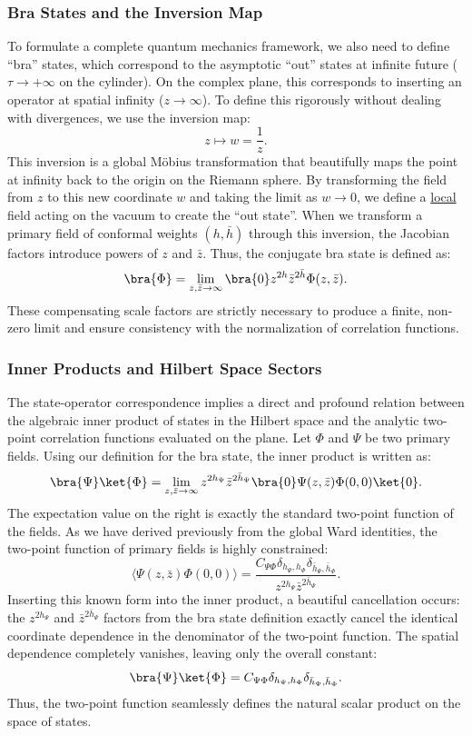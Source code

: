 \subsubsection{Bra States and the Inversion Map}

To formulate a complete quantum mechanics framework, we also need to define ``bra'' states, which correspond to the asymptotic ``out'' states at infinite future (\(\tau \to +\infty\) on the cylinder). On the complex plane, this corresponds to inserting an operator at spatial infinity (\(z \to \infty\)). To define this rigorously without dealing with divergences, we use the inversion map:
\[
    z \mapsto w = \frac{1}{z}.
\]
This inversion is a global Möbius transformation that beautifully maps the point at infinity back to the origin on the Riemann sphere. By transforming the field from \(z\) to this new coordinate \(w\) and taking the limit as \(w \to 0\), we define a \uline{local} field acting on the vacuum to create the ``out state''. When we transform a primary field of conformal weights \((h, \bar{h})\) through this inversion, the Jacobian factors introduce powers of \(z\) and \(\bar{z}\). Thus, the conjugate bra state is defined as:
\[
    \bra{\Phi} = \lim_{z,\bar{z} \to \infty} \bra{0} z^{2h} \bar{z}^{2\bar{h}} \Phi(z, \bar{z}).
\]
These compensating scale factors are strictly necessary to produce a finite, non-zero limit and ensure consistency with the normalization of correlation functions.

\subsubsection{Inner Products and Hilbert Space Sectors}

The state-operator correspondence implies a direct and profound relation between the algebraic inner product of states in the Hilbert space and the analytic two-point correlation functions evaluated on the plane.
Let \(\Phi\) and \(\Psi\) be two primary fields. Using our definition for the bra state, the inner product is written as:
\[
    \bra{\Psi} \ket{\Phi} = \lim_{z,\bar{z} \to \infty} z^{2h_\Psi} \bar{z}^{2\bar{h}_\Psi} \bra{0} \Psi(z,\bar{z}) \Phi(0,0) \ket{0}.
\]
The expectation value on the right is exactly the standard two-point function of the fields. As we have derived previously from the global Ward identities, the two-point function of primary fields is highly constrained:
\[
    \langle \Psi(z,\bar{z}) \Phi(0,0) \rangle = \frac{C_{\Psi\Phi} \delta_{h_\Psi, h_\Phi} \delta_{\bar{h}_\Psi, \bar{h}_\Phi}}{z^{2h_\Psi} \bar{z}^{2\bar{h}_\Psi}}.
\]
Inserting this known form into the inner product, a beautiful cancellation occurs: the \(z^{2h_\Psi}\) and \(\bar{z}^{2\bar{h}_\Psi}\) factors from the bra state definition exactly cancel the identical coordinate dependence in the denominator of the two-point function. The spatial dependence completely vanishes, leaving only the overall constant:
\[
    \bra{\Psi} \ket{\Phi} = C_{\Psi\Phi} \delta_{h_\Psi, h_\Phi} \delta_{\bar{h}_\Psi, \bar{h}_\Phi}.
\]
Thus, the two-point function seamlessly defines the natural scalar product on the space of states.

